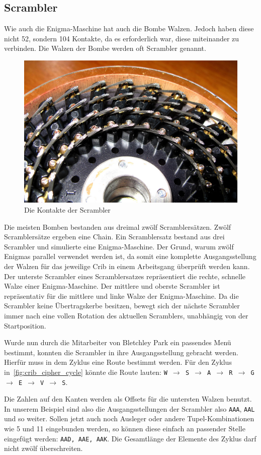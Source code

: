 \newpage

\subsection{Scrambler}\label{subsec:scrambler}
Wie auch die Enigma-Maschine hat auch die Bombe \glqq Walzen\grqq.
Jedoch haben diese nicht 52, sondern 104 Kontakte, da es erforderlich war, diese miteinander zu verbinden.
Die Walzen der Bombe werden oft Scrambler genannt.

\begin{figure}[htbp]
	\centering
	\includegraphics[width=0.4\linewidth]{Turing Bomb/WireBrushesOnBombeDrum}
	\caption{Die Kontakte der Scrambler\autocite{wiki:bombescrambler}}
	\label{fig:scrambler}
\end{figure} 


Die meisten Bomben bestanden aus dreimal zwölf Scramblersätzen.
Zwölf Scramblersätze ergeben eine \glqq Chain\grqq.
Ein Scramblersatz bestand aus drei Scrambler und simulierte eine Enigma-Maschine.
Der Grund, warum zwölf \glqq Enigmas\grqq{} parallel verwendet werden ist, da somit eine komplette Ausgangsstellung der Walzen für das jeweilige Crib in einem Arbeitsgang überprüft werden kann.
Der unterste Scrambler eines Scramblersatzes repräsentiert die rechte, schnelle Walze einer Enigma-Maschine.
Der mittlere und oberste Scrambler ist repräsentativ für die mittlere und linke Walze der Enigma-Maschine.
Da die Scrambler keine Übertragskerbe besitzen, bewegt sich der nächste Scrambler immer nach eine vollen Rotation des aktuellen Scramblers, unabhängig von der Startposition. 

Wurde nun durch die Mitarbeiter von Bletchley Park ein passendes Menü bestimmt, konnten die Scrambler in ihre Ausgangsstellung gebracht werden. 
Hierfür muss in dem Zyklus eine \glqq Route\grqq{} bestimmt werden.
Für den Zyklus in~\cref{fig:crib_cipher_cycle} könnte die Route lauten: \texttt{W $\to$ S $\to$ A $\to$ R $\to$ G $\to$ E $\to$ V $\to$ S}.

Die Zahlen auf den Kanten werden als \glqq Offsets\grqq{} für die untersten Walzen benutzt.
In unserem Beispiel sind also die Ausgangsstellungen der Scrambler also \texttt{AAA}, \texttt{AAL} und so weiter.
Sollen jetzt auch noch Ausleger oder andere Tupel-Kombinationen wie 5 und 11 eingebunden werden, so können diese einfach an passender Stelle eingefügt werden: \texttt{AAD, AAE, AAK}.
Die Gesamtlänge der Elemente des Zyklus darf nicht zwölf überschreiten.

